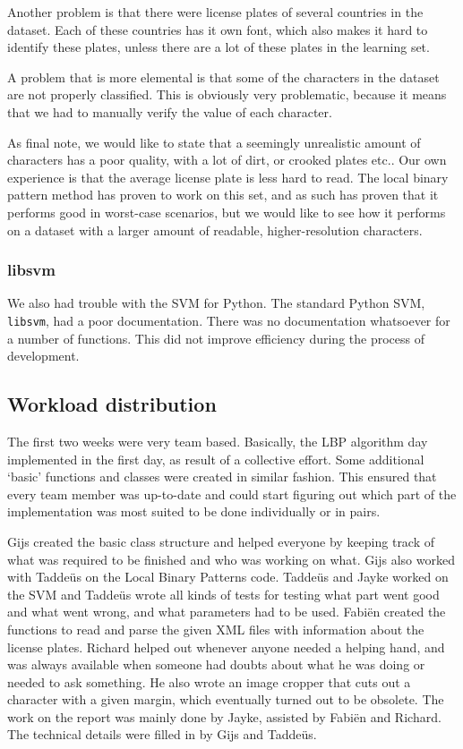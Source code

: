 \documentclass[a4paper]{article}
\begin{document}
Another problem is that there were license plates of several countries in
the dataset. Each of these countries has it own font, which also makes it
hard to identify these plates, unless there are a lot of these plates in the
learning set.

A problem that is more elemental is that some of the characters in the dataset
are not properly classified. This is obviously very problematic, because it
means that we had to manually verify the value of each character.

As final note, we would like to state that a seemingly unrealistic amount
of characters has a poor quality, with a lot of dirt, or crooked plates
etc.. Our own experience is that the average license plate is less hard to
read. The local binary pattern method has proven to work on this set, and as
such has proven that it performs good in worst-case scenarios, but we would
like to see how it performs on a dataset with a larger amount of readable,
higher-resolution characters.

\subsubsection*{libsvm}

We also had trouble with the SVM for Python. The standard Python SVM,
\texttt{libsvm}, had a poor documentation. There was no documentation
whatsoever for a number of functions. This did not improve efficiency during
the process of development.

\subsection{Workload distribution}

The first two weeks were very team based. Basically, the LBP algorithm day
implemented in the first day, as result of a collective effort. Some
additional `basic' functions and classes were created in similar fashion. This
ensured that every team member was up-to-date and could start figuring out
which part of the implementation was most suited to be done individually or in
pairs.

Gijs created the basic class structure and helped everyone by keeping track of
what was required to be finished and who was working on what. Gijs also
worked with Tadde\"us on the Local Binary Patterns code.  Tadde\"us and Jayke
worked on the SVM and Tadde\"us wrote all kinds of tests for testing what part
went good and what went wrong, and what parameters had to be used. Fabi\"en
created the functions to read and parse the given XML files with information
about the license plates. Richard helped out whenever anyone needed a helping
hand, and was always available when someone had doubts about what he was doing
or needed to ask something. He also wrote an image cropper that cuts out a
character with a given margin, which eventually turned out to be obsolete. The
work on the report was mainly done by Jayke, assisted by Fabi\"en and Richard.
The technical details were filled in by Gijs and Tadde\"us.
\end{document}
